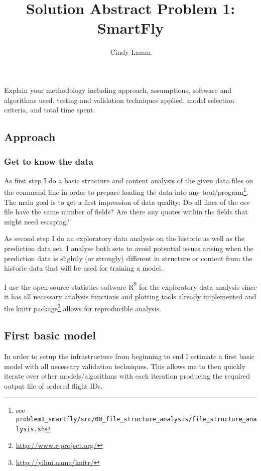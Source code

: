\documentclass[12pt,a4paper]{article}
\author{Cindy Lamm}
\title{Solution Abstract Problem 1: SmartFly}
\begin{document}
\VerbatimFootnotes
\maketitle

Explain your methodology including approach, assumptions, software and algorithms used, testing and validation techniques applied, model selection criteria, and total time spent.

\subsection{Approach} %
\label{sub:approach}

\subsubsection{Get to know the data} %
\label{subsub:get2know_data}

As first step I do a basic structure and content analysis of the given data files on the command line in order to prepare loading the data into any tool/program\footnote{see \verb+problem1_smartfly/src/00_file_structure_analysis/file_structure_analysis.sh+ }. The main goal is to get a first impression of data quality: Do all lines of the csv file have the same number of fields? Are there any quotes within the fields that might need escaping?

As second step I do an exploratory data analysis on the historic as well as the prediction data set. I analyse both sets to avoid potential issues arising when the prediction data is slightly (or strongly) different in structure or content from the historic data that will be used for training a model. 

I use the open source statistics software R\footnote{\url{http://www.r-project.org/}} for the exploratory data analysis since it has all necessary analysis functions and plotting tools already implemented and the knitr package\footnote{\url{http://yihui.name/knitr/}} allows for reproducible analysis.


\subsection{First basic model} %
\label{sub:first_basic_model}

In order to setup the infrastructure from beginning to end I estimate a first basic model with all necessary validation techniques. This allows me to then quickly iterate over other models/algorithms with each iteration producing the required output file of ordered flight IDs.
\end{document}
